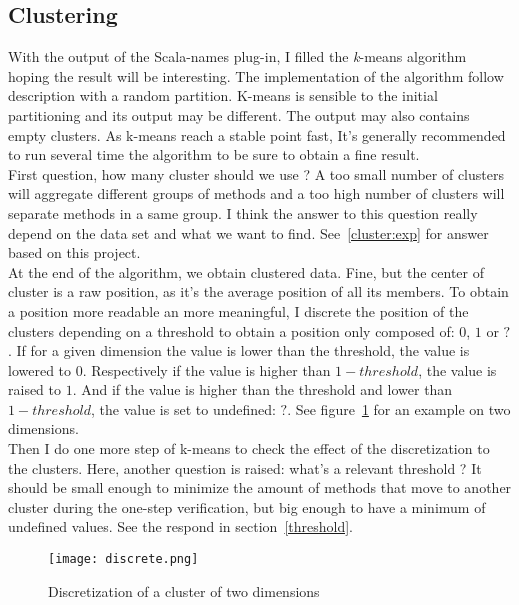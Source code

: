 \documentclass[12pt]{article}
\newcommand{\code}[1]{{\fontfamily{phv}\selectfont \small{\begin{tabbing} #1 \end{tabbing}}}}
\begin{document}
\subsection{Clustering}
\label{cluster}
With the output of the Scala-names plug-in, I filled the \textit{k}-means algorithm~\cite{kMeans} hoping the result will be interesting. The implementation of the algorithm follow~\cite{kMeans} description with a random partition. K-means is sensible to the initial partitioning and its output may be different. The output may also contains empty clusters. As k-means reach a stable point fast, It's generally recommended to run several time the algorithm to be sure to obtain a fine result.\\
First question, how many cluster should we use ? A too small number of clusters will aggregate different groups of methods and a too high number of clusters will separate methods in a same group. I think the answer to this question really depend on the data set and what we want to find. See~\ref{cluster:exp} for answer based on this project.\\
At the end of the algorithm, we obtain clustered data. Fine, but the center of cluster is a raw position, as it's the average position of all its members. To obtain a position more readable an more meaningful, I discrete the position of the clusters depending on a threshold to obtain a position only composed of: $0$, $1$ or $?$. If for a given dimension the value is lower than the threshold, the value is lowered to $0$. Respectively if the value is higher than $1-threshold$, the value is raised to $1$. And if the value is higher than the threshold and lower than $1-threshold$, the value is set to undefined: $?$. See figure~\ref{discrete} for an example on two dimensions.\\
Then I do one more step of k-means to check the effect of the discretization to the clusters. Here, another question is raised: what's a relevant threshold ? It should be small enough to minimize the amount of methods that move to another cluster during the one-step verification, but big enough to have a minimum of undefined values. See the respond in section~\ref{threshold}.
\begin{figure}[tbc]
\centering
\texttt{[image: discrete.png]}
\caption{Discretization of a cluster of two dimensions}
\label{discrete}
\end{figure}
\end{document}
